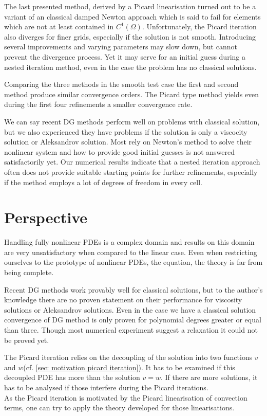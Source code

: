 The last presented method, derived by a Picard linearisation turned out to be a variant of an classical damped Newton approach which is said to fail for elements which are not at least contained in $C^1(\Omega)$.
Unfortunately, the Picard iteration also diverges for finer grids, especially if the solution is not smooth. Introducing several improvements and varying parameters may slow down, but cannot prevent the divergence process. Yet it may serve for an initial guess during a nested iteration method, even in the case the problem has no classical solutions.

Comparing the three methods in the smooth test case the first and second method produce similar convergence orders. %
The Picard type method yields even during the first four refinements a smaller convergence rate. 

We can say recent DG methods perform well on problems with classical solution, but we also experienced they have problems if the \MA solution is only a viscocity solution or Aleksandrov solution. Most rely on Newton's method to solve their nonlinear system and how to provide good initial guesses is not answered satisfactorily yet.
Our numerical results indicate that a nested iteration approach often does not provide suitable starting points for further refinements, especially if the method employs a lot of degrees of freedom in every cell.

\section{Perspective}
Handling fully nonlinear PDEs is a complex domain and results on this domain are very unsatisfactory when compared to the linear case. Even when restricting ourselves to the prototype of nonlinear PDEs, the \MA equation, the theory is far from being complete. %

Recent DG methods work provably well for classical solutions, but to the author's knowledge there are no proven statement on their performance for viscosity solutions or Aleksandrov solutions. Even in the case we have a classical solution convergence of DG method is only proven for polynomial degrees greater or equal than three. Though most numerical experiment suggest a relaxation it could not be proved yet.

The Picard iteration relies on the decoupling of the solution into two functions $v$ and $w$(cf. \ref{sec: motivation picard iteration}). It has to be examined if this decoupled PDE has more than the solution $v=w$. If there are more solutions, it has to be analysed if those interfere during the Picard iterations. \\
As the Picard iteration is motivated by the Picard linearisation of convection terms, one can try to apply the theory developed for those linearisations.

